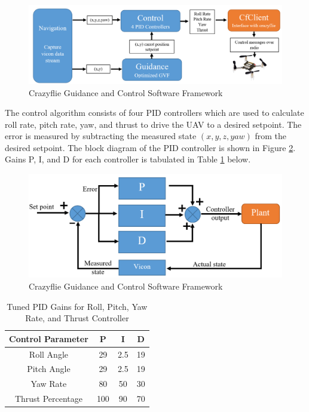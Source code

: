 \documentclass[numbered,pdftex]{ohio-etd}
\begin{document}
\begin{figure}[H]
	\centering
	\includegraphics[trim=0 0 1 0,clip,width=14cm]{PaperFigures/Methods/cfControlClass}
	\caption{Crazyflie Guidance and Control Software Framework}
	\label{fig:cfControlClass}
\end{figure}

The control algorithm consists of four PID controllers which are used to calculate roll rate, pitch rate, yaw, and thrust to drive the UAV to a desired setpoint. The error is measured by subtracting the measured state $(x,y,z,yaw)$ from the desired setpoint. The block diagram of the PID controller is shown in Figure \ref{fig:pid}. Gains P, I, and D for each controller is tabulated in Table \ref{table:pidGains} below. 



\begin{figure}[H]
	\centering
	\includegraphics[trim=0 0 0 0,clip,width=14cm]{PaperFigures/Methods/pid}
	\caption{Crazyflie Guidance and Control Software Framework}
	\label{fig:pid}
\end{figure}

\begin{table}[H]
	\centering
	\caption{Tuned PID Gains for Roll, Pitch, Yaw Rate, and Thrust Controller}
	\label{table:pidGains}
	\begin{tabular}{|c|c|c|c|}
		\hline 
		Control Parameter & P & I & D \\ 
		\hline 
		Roll Angle & 29 & 2.5 & 19 \\ 
		\hline 
		Pitch Angle & 29 & 2.5 & 19 \\ 
		\hline 
		Yaw Rate & 80 & 50 & 30 \\ 
		\hline 
		Thrust Percentage & 100 & 90 & 70 \\ 
		\hline 
	\end{tabular}
\end{table}
 
\end{document}
